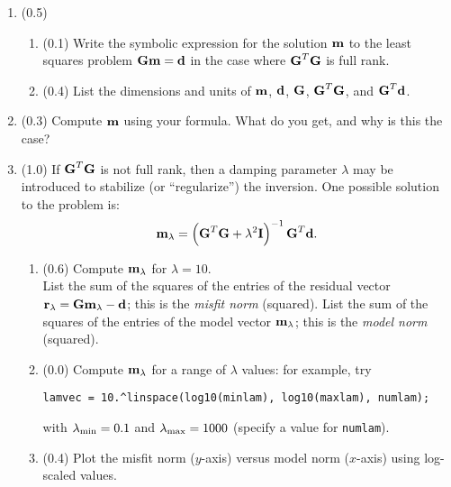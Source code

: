 \documentclass[11pt,titlepage,fleqn]{article}
\begin{document}
\begin{enumerate}
\item (0.5)
\begin{enumerate}
\item (0.1) Write the symbolic expression for the solution $\mbox{${\bf m}$}$ to the least squares problem $\mbox{${\bf G}$}\mbox{${\bf m}$}=\mbox{${\bf d}$}$ in the case where $\mbox{${\bf G}$}^T\mbox{${\bf G}$}$ is full rank.

\item (0.4) List the dimensions and units of $\mbox{${\bf m}$}$, $\mbox{${\bf d}$}$, $\mbox{${\bf G}$}$, $\mbox{${\bf G}$}^T\mbox{${\bf G}$}$, and $\mbox{${\bf G}$}^T\mbox{${\bf d}$}$.
\end{enumerate}


\item (0.3) Compute $\mbox{${\bf m}$}$ using your formula.  What do you get, and why is this the case?


\item (1.0) If $\mbox{${\bf G}$}^T\mbox{${\bf G}$}$ is not full rank, then a damping parameter $\lambda$ may be introduced to stabilize (or ``regularize'') the inversion.  One possible solution to the problem is:
%
\begin{equation}
\mbox{${\bf m}$}_{\lambda} = \left(\mbox{${\bf G}$}^T\mbox{${\bf G}$}+\lambda^2\mbox{${\bf I}$}\right)^{-1}\mbox{${\bf G}$}^T\mbox{${\bf d}$}.
\end{equation}
%
\begin{enumerate}

\item (0.6) Compute $\mbox{${\bf m}$}_{\lambda}$ for $\lambda = 10$. \\
List the sum of the squares of the entries of the residual vector $\mbox{${\bf r}$}_\lambda = \mbox{${\bf G}$}\mbox{${\bf m}$}_\lambda-\mbox{${\bf d}$}$; this is the {\em misfit norm} (squared).
List the sum of the squares of the entries of the model vector $\mbox{${\bf m}$}_{\lambda}$; this is the {\em model norm} (squared).


\item (0.0) Compute $\mbox{${\bf m}$}_{\lambda}$ for a range of $\lambda$ values: for example, try

\verb+lamvec = 10.^linspace(log10(minlam), log10(maxlam), numlam);+

with $\lambda_{\rm min} = 0.1$ and $\lambda_{\rm max} = 1000$ (specify a value for \verb+numlam+).


\item (0.4) Plot the misfit norm ($y$-axis) versus model norm ($x$-axis) using log-scaled values.



\end{enumerate}
\end{enumerate}
\end{document}
